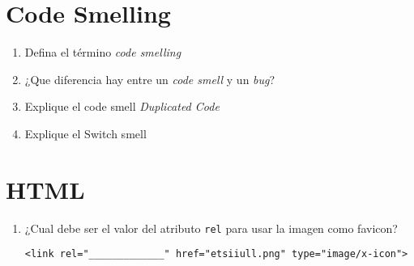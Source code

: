 \documentclass[spanish,a4paper,11pt]{article}
\begin{document}
\section{Code Smelling}
\begin{enumerate}
\item 
Defina el término {\it code smelling}
\item 
¿Que diferencia hay entre un {\it code smell} y un {\it bug}?

\item  Explique el code smell {\it Duplicated Code}
\item  Explique el Switch smell
\end{enumerate}

\section{HTML}
\begin{enumerate}
\item ¿Cual debe ser el valor del atributo \verb|rel| para usar la imagen como favicon?
\begin{verbatim}
<link rel="_____________" href="etsiiull.png" type="image/x-icon"> 
\end{verbatim}
\end{enumerate}
\end{document}
